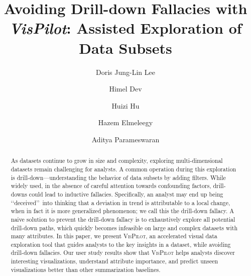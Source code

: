 \documentclass[sigchi]{acmart}
\newcommand{\system}{\textsc{VisPilot}\xspace}
\begin{document}
\author{Doris Jung-Lin Lee}

\author{Himel Dev}
\author{Huizi Hu}
\author{Hazem Elmeleegy}

\author{Aditya Parameswaran}
\title{Avoiding Drill-down Fallacies with {\em VisPilot}: Assisted Exploration of Data Subsets}
\begin{abstract}
As datasets continue to grow in size and complexity, exploring multi-dimensional datasets remain challenging for analysts. A common operation during this exploration is drill-down---understanding the behavior of data subsets by adding filters. While widely used, in the absence of careful attention towards confounding factors, drill-downs could lead to inductive fallacies. Specifically, an analyst may end up being \lq\lq deceived\rq\rq\ into thinking that a deviation in trend is attributable to a local change, when in fact it is more generalized phenomenon; we call this the drill-down fallacy. A naive solution to prevent the drill-down fallacy is to exhaustively explore all potential drill-down paths, which quickly becomes infeasible on large and complex datasets with many attributes. In this paper, we present \system, an accelerated visual data exploration tool that guides analysts to the key insights in a dataset, while avoiding drill-down fallacies. Our user study results show that \system helps analysts discover interesting visualizations, understand attribute importance, and predict unseen visualizations better than other summarization baselines.
\end{abstract}
\maketitle


\end{document}

